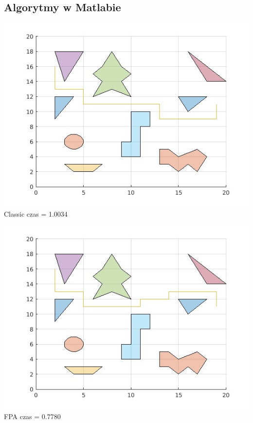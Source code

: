 \documentclass[aspectratio=169,15pt,]{beamer}
\begin{document}
\subsection{Algorytmy w Matlabie}
\begin{frame}
	\subsectionpage
\end{frame}
\begin{frame}
\includegraphics[width =\textwidth,height=0.9\textheight]{Obrazy/NoGazeboClassic.jpg}
\centering
Classic czas = 1.0034
\end{frame}
\begin{frame}
\includegraphics[width =\textwidth,height=0.9\textheight]{Obrazy/NoGazeboFPA.jpg}
\centering
FPA czas = 0.7780
\end{frame}
\end{document}
